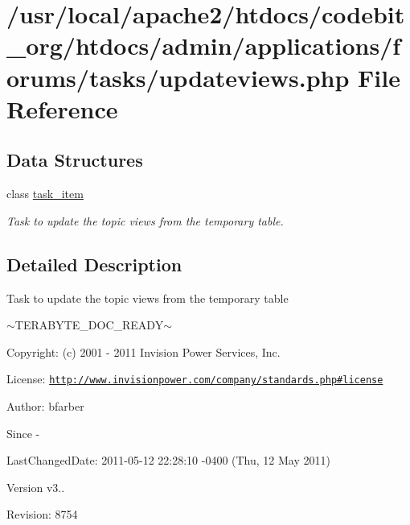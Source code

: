 \hypertarget{updateviews_8php}{\section{/usr/local/apache2/htdocs/codebit\-\_\-org/htdocs/admin/applications/forums/tasks/updateviews.php File Reference}
\label{updateviews_8php}
}
\subsection*{Data Structures}
\begin{DoxyCompactItemize}
\item 
class \hyperlink{classtask__item}{task\-\_\-item}
\begin{DoxyCompactList}\small\item\em Task to update the topic views from the temporary table. \end{DoxyCompactList}\end{DoxyCompactItemize}


\subsection{Detailed Description}
\begin{DoxyVerb}  Task to update the topic views from the temporary table
\end{DoxyVerb}
 $\sim$\-T\-E\-R\-A\-B\-Y\-T\-E\-\_\-\-D\-O\-C\-\_\-\-R\-E\-A\-D\-Y$\sim$ \begin{DoxyParagraph}{Copyright\-:}
(c) 2001 -\/ 2011 Invision Power Services, Inc.
\end{DoxyParagraph}
\begin{DoxyParagraph}{License\-:}
\href{http://www.invisionpower.com/company/standards.php#license}{\tt http\-://www.\-invisionpower.\-com/company/standards.\-php\#license}
\end{DoxyParagraph}
\begin{DoxyParagraph}{Author\-:}
bfarber 
\end{DoxyParagraph}
\begin{DoxySince}{Since}
-\/ 
\end{DoxySince}
\begin{DoxyParagraph}{Last\-Changed\-Date\-:}
2011-\/05-\/12 22\-:28\-:10 -\/0400 (Thu, 12 May 2011) 
\end{DoxyParagraph}
\begin{DoxyVersion}{Version}
v3.. 
\end{DoxyVersion}
\begin{DoxyParagraph}{Revision\-:}
8754 
\end{DoxyParagraph}
